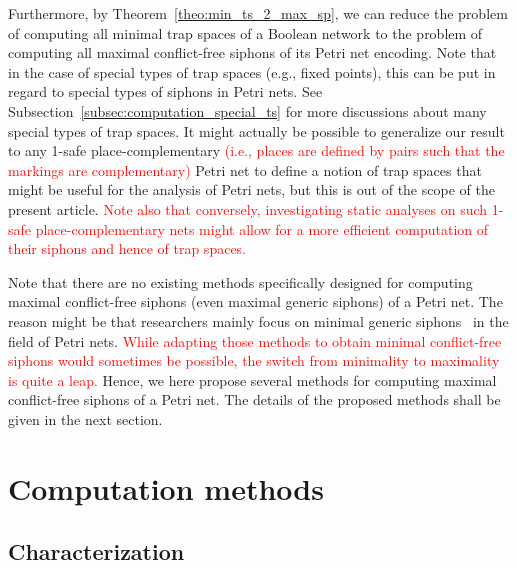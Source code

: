 \documentclass[preprint,12pt]{elsarticle}
\newcommand{\change}[1]{\textcolor{red}{#1}}
\begin{document}
Furthermore, by Theorem~\ref{theo:min_ts_2_max_sp}, we can reduce the problem of computing all minimal trap spaces of a Boolean network to the problem of computing all maximal conflict-free siphons of its Petri net encoding.
Note that in the case of special types of trap spaces (e.g., fixed points), this can be put in regard to special types of siphons in Petri nets.
See Subsection~\ref{subsec:computation_special_ts} for more discussions about many special types of trap spaces.
It might actually be possible to generalize our result to any 1-safe place-complementary \change{(i.e., places are defined by pairs such that the markings are complementary)} Petri net to define a notion of trap spaces that might be useful for the analysis of Petri nets, but this is out of the scope of the present article.
\change{Note also that conversely, investigating static analyses on such 1-safe place-complementary nets might allow for a more efficient computation of their siphons and hence of trap spaces.}

Note that there are no existing methods specifically designed for computing maximal conflict-free siphons (even maximal generic siphons) of a Petri net.
The reason might be that researchers mainly focus on minimal generic siphons~\cite{DBLP:journals/isci/LiuB16} in the field of Petri nets.
\change{While adapting those methods to obtain minimal conflict-free siphons would sometimes be possible, the switch from minimality to maximality is quite a leap.}
Hence, we here propose several methods for computing maximal conflict-free siphons of a Petri net.
The details of the proposed methods shall be given in the next section.

\section{Computation methods}%
\label{sec:Computation}

\subsection{Characterization}%
\label{subsec:siphon_characterization}
\end{document}
